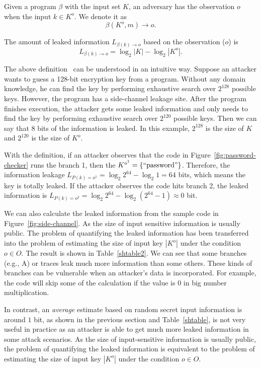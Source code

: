 \begin{mydef}
    \label{chapter4:def}
    Given a program $\beta$ with the input set $K$,
    an adversary has the observation $o$ when the input $k{\in}K^o$.
    We denote it as
    $$\beta(K^o, m) \rightarrow	o.$$

    The amount of leaked information $L_{\beta(k)\rightarrow o}$ based on the observation ($o$) is
    $$L_{\beta(k)\rightarrow o} = \log_2{|K|} - \log_2{|K^o|}.$$
\end{mydef}

The above definition~\cite{AskarovC12} can be understood in an intuitive way. Suppose an attacker
wants to guess a 128-bit encryption key from a program.
Without any domain knowledge,
he can find the key by performing exhaustive search over $2^{128}$ possible keys.
However, the program has a side-channel leakage site. After the program finishes execution, the
attacker gets some leaked information and only needs to find the key by performing
exhaustive search over $2^{120}$ possible keys. Then we can say that 8 bits of the information
is leaked. In this example, $2^{128}$ is the size of $K$ and $2^{120}$ is the size of $K^o$.


With the definition, if an attacker observes that the code in
Figure~\ref{fig:password-checker} runs the branch 1, then the $K^{o^{1}} =
    \{\mathrm{``password"}\}$. Therefore, the information leakage $L_{P(k)=o^{1}} =
    \log_2{2^{64}} - \log_2{1} = 64$ bits, which means the key is totally leaked. If
the attacker observes the code hits branch 2, the leaked information is
$L_{P(k)=o^{2}} = \log_2{2^{64}} - \log_2{(2^{64}-1)} \approx 0$ bit.


We can also calculate the leaked information from the sample code in
Figure~\ref{fig:side-channel}. As the size of input sensitive information is
usually public. The problem of quantifying the leaked information has been
transferred into the problem of estimating the size of input key $|K^o|$ under
the condition $o \in O$. The result is shown in Table~\ref{shtable2}. We can see
that some branches (e.g., A) or traces leak much more information than some others.
These kinds of branches can be vulnerable when an attacker's data is incorporated.
For example, the code will skip some of the calculation if the value is 0 in big
number multiplication.

In contrast, an \emph{average} estimate based on random secret input information is around $1$ bit, as shown in the previous section and Table~\ref{shtable}, is not very useful in practice as an attacker is able to get much more leaked
information in some attack scenarios. As the size of input-sensitive information is
usually public, the problem of quantifying the leaked information is equivalent to the problem of estimating the size of input key $|K^o|$ under
the condition $o \in O$. 


